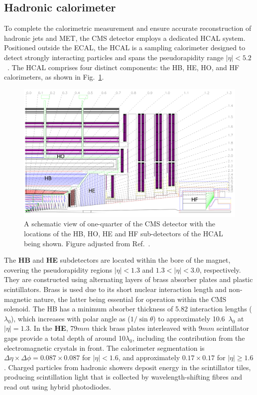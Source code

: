 \subsection{Hadronic calorimeter}
To complete the calorimetric measurement and ensure accurate reconstruction of hadronic jets and \ac{MET}, the CMS detector employs a dedicated HCAL system. Positioned outside the ECAL, the HCAL is a sampling calorimeter designed to detect strongly interacting particles and spans the pseudorapidity range $|\eta| < 5.2$~\cite{LHC_CMS,CMS_Detector_Run3}. The HCAL comprises four distinct components: the \ac{HB}, \ac{HE}, \ac{HO}, and \ac{HF} calorimeters, as shown in Fig.~\ref{Figure:Chapter3_CMS_HCAL}.

\begin{figure}[h]
\centering
\includegraphics[width= 1.0\textwidth]{Figures/Chapter3/CMS_HCAL.pdf}
\caption[Schematic of CMS detector highlighting HCAL sub-detectors]{A schematic view of one-quarter of the CMS detector with the locations of the HB, HO, HE and HF sub-detectors of the HCAL being shown. Figure adjusted from Ref.~\cite{LHC_CMS}.}
\label{Figure:Chapter3_CMS_HCAL}
\end{figure}

The \textbf{HB} and \textbf{HE} subdetectors are located within the bore of the magnet, covering the pseudorapidity regions $|\eta| < 1.3$ and $1.3 < |\eta| < 3.0$, respectively. They are constructed using alternating layers of brass absorber plates and plastic scintillators. Brass is used due to its short nuclear interaction length and non-magnetic nature, the latter being essential for operation within the CMS solenoid. The HB has a minimum absorber thickness of 5.82 interaction lengths ($\lambda_0$), which increases with polar angle as ($1/\sin\theta$) to approximately 10.6~$\lambda_0$ at $|\eta| = 1.3$. In the \textbf{HE}, 79$\unit{mm}$ thick brass plates interleaved with 9$\unit{mm}$ scintillator gaps provide a total depth of around 10$\lambda_0$, including the contribution from the electromagnetic crystals in front. The calorimeter segmentation is $\Delta\eta \times \Delta\phi = 0.087 \times 0.087$ for $|\eta| < 1.6$, and approximately $0.17 \times 0.17$ for $|\eta| \geq 1.6$. Charged particles from hadronic showers deposit energy in the scintillator tiles, producing scintillation light that is collected by wavelength-shifting fibres and read out using hybrid photodiodes.

